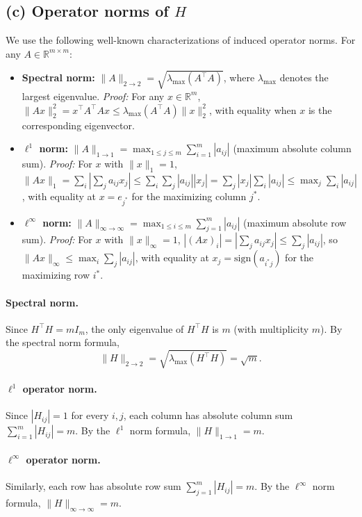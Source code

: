 \documentclass{article}
\begin{document}
\subsection*{(c) Operator norms of $H$}

We use the following well-known characterizations of induced operator norms. For any $A\in\mathbb{R}^{m\times m}$:
\begin{itemize}
\item \textbf{Spectral norm:} $\|A\|_{2\to 2} = \sqrt{\lambda_{\max}(A^\top A)}$, where $\lambda_{\max}$ denotes the largest eigenvalue. \textit{Proof:} For any $x\in\mathbb{R}^m$, $\|Ax\|_2^2 = x^\top A^\top A x \leq \lambda_{\max}(A^\top A)\|x\|_2^2$, with equality when $x$ is the corresponding eigenvector.
\item \textbf{$\ell^1$ norm:} $\|A\|_{1\to 1} = \max_{1\leq j\leq m}\sum_{i=1}^m |a_{ij}|$ (maximum absolute column sum). \textit{Proof:} For $x$ with $\|x\|_1=1$, $\|Ax\|_1 = \sum_i|\sum_j a_{ij}x_j| \leq \sum_i\sum_j|a_{ij}||x_j| = \sum_j|x_j|\sum_i|a_{ij}| \leq \max_j\sum_i|a_{ij}|$, with equality at $x=e_{j^*}$ for the maximizing column $j^*$.
\item \textbf{$\ell^\infty$ norm:} $\|A\|_{\infty\to\infty} = \max_{1\leq i\leq m}\sum_{j=1}^m |a_{ij}|$ (maximum absolute row sum). \textit{Proof:} For $x$ with $\|x\|_\infty=1$, $|(Ax)_i| = |\sum_j a_{ij}x_j| \leq \sum_j|a_{ij}|$, so $\|Ax\|_\infty \leq \max_i\sum_j|a_{ij}|$, with equality at $x_j = \mathrm{sign}(a_{i^*j})$ for the maximizing row $i^*$.
\end{itemize}

\paragraph{Spectral norm.}
Since $H^\top H=mI_m$, the only eigenvalue of $H^\top H$ is $m$ (with multiplicity $m$). By the spectral norm formula,
\[
\|H\|_{2\to 2} = \sqrt{\lambda_{\max}(H^\top H)} = \sqrt{m}.
\]

\paragraph{$\ell^1$ operator norm.}
Since $|H_{ij}|=1$ for every $i,j$, each column has absolute column sum $\sum_{i=1}^m |H_{ij}| = m$. By the $\ell^1$ norm formula, $\|H\|_{1\to 1}=m$.

\paragraph{$\ell^\infty$ operator norm.}
Similarly, each row has absolute row sum $\sum_{j=1}^m |H_{ij}| = m$. By the $\ell^\infty$ norm formula, $\|H\|_{\infty\to \infty}=m$.
\end{document}
